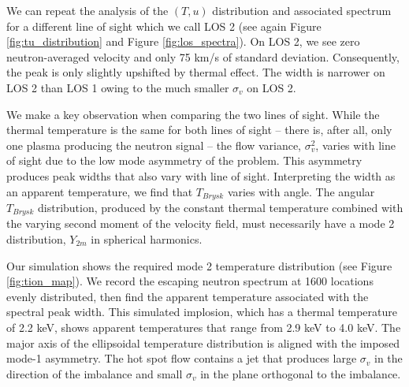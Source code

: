 \documentclass[aip,pop,numerical,reprint,floatfix]{revtex4-1}
\begin{document}
We can repeat the analysis of the $(T,u)$ distribution and associated
spectrum for a different line of sight which we call LOS 2 (see again
Figure \ref{fig:tu_distribution} and Figure \ref{fig:los_spectra}). On LOS 2,
we see zero neutron-averaged velocity and only 75 km/s of standard
deviation. Consequently, the peak is only slightly upshifted by thermal
effect. The width is narrower on LOS 2 than LOS 1 owing to the much
smaller $\sigma_{v}$ on LOS 2.

We make a key observation when comparing the two lines of sight. While
the thermal temperature is the same for both lines of sight -- there
is, after all, only one plasma producing the neutron signal -- the
flow variance, $\sigma_{v}^{2}$, varies with line of sight due to
the low mode asymmetry of the problem. This asymmetry produces peak
widths that also vary with line of sight. Interpreting the width as
an apparent temperature, we find that $T_{Brysk}$ varies with angle.
The angular $T_{Brysk}$ distribution, produced by the constant thermal
temperature combined with the varying second moment of the velocity
field, must necessarily have a mode 2 distribution, $Y_{2m}$ in spherical
harmonics. 

Our simulation shows the required mode 2 temperature distribution
(see Figure \ref{fig:tion_map}). We record the escaping neutron spectrum
at 1600 locations evenly distributed, then find the apparent temperature
associated with the spectral peak width. This simulated implosion,
which has a thermal temperature of 2.2 keV, shows apparent temperatures
that range from 2.9 keV to 4.0 keV. The major axis of the ellipsoidal
temperature distribution is aligned with the imposed mode-1 asymmetry.
The hot spot flow contains a jet that produces large $\sigma_{v}$
in the direction of the imbalance and small $\sigma_{v}$ in the plane
orthogonal to the imbalance. 
\end{document}
